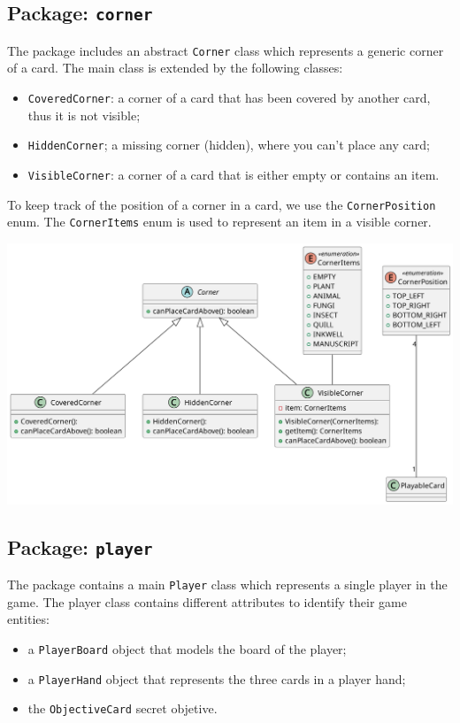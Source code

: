 \documentclass{article}
\begin{document}
\subsection{Package: \texttt{corner}}
The package includes an abstract \texttt{Corner} class which represents a generic corner of a card.
The main class is extended by the following classes:
\begin{itemize}
    \item \texttt{CoveredCorner}: a corner of a card that has been covered by another card, thus it is not visible;
    \item \texttt{HiddenCorner}; a missing corner (hidden), where you can't place any card;
    \item \texttt{VisibleCorner}: a corner of a card that is either empty or contains an item.
\end{itemize}
To keep track of the position of a corner in a card, we use the \texttt{CornerPosition} enum.
\noindent
The \texttt{CornerItems} enum is used to represent an item in a visible corner.
\vspace{1cm}
\begin{center}
    \hspace*{-2cm}\includegraphics[scale=0.15]{pngs/corner}
\end{center}

\newpage
\subsection{Package: \texttt{player}}
The package contains a main \texttt{Player} class which represents a single player in the game.
The player class contains different attributes to identify their game entities:
\begin{itemize}
    \item a \texttt{PlayerBoard} object that models the board of the player;
    \item a \texttt{PlayerHand} object that represents the three cards in a player hand;
    \item the \texttt{ObjectiveCard} secret objetive.
\end{itemize}
\end{document}
